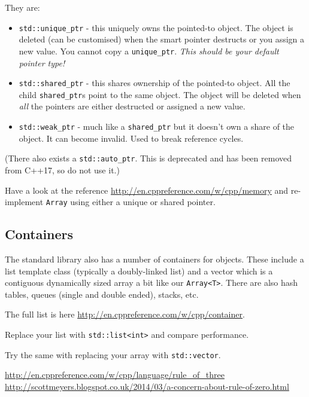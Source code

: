 \documentclass{article}
\newcommand{\code}[1]{\lstinline!#1!}
\begin{document}
They are:
\begin{itemize}
\item \code{std::unique_ptr} - this uniquely owns the pointed-to
  object. The object is deleted (can be customised) when the smart
  pointer destructs or you assign a new value. You cannot copy a
  \code{unique_ptr}. \emph{This should be your default pointer type!}

\item \code{std::shared_ptr} - this shares ownership of the pointed-to
  object. All the child \code{shared_ptr}s  point to the same object. The
  object will be deleted when \emph{all} the pointers are either
  destructed or assigned a new value.

\item \code{std::weak_ptr} - much like a \code{shared_ptr} but it
  doesn't own a share of the object. It can become invalid. Used to
  break reference cycles.
\end{itemize}

(There also exists a \code{std::auto_ptr}. This is deprecated and has
been removed from C++17, so do not use it.)

Have a look at the reference
\url{http://en.cppreference.com/w/cpp/memory} and re-implement
\code{Array} using either a unique or shared pointer.


\subsection{Containers}
The standard library also has a number of containers for
objects. These include a list template class (typically a
doubly-linked list) and a vector which is a contiguous dynamically
sized array a bit like our \code{Array<T>}. There are also hash
tables, queues (single and double ended), stacks, etc.

The full list is here \url{http://en.cppreference.com/w/cpp/container}.

Replace your list with \code{std::list<int>} and compare performance.

Try the same with replacing your array with \code{std::vector}.

\begin{thebibliography}{9}
  \url{http://en.cppreference.com/w/cpp/language/rule_of_three}
  \url{http://scottmeyers.blogspot.co.uk/2014/03/a-concern-about-rule-of-zero.html}
\end{thebibliography}
\end{document}
